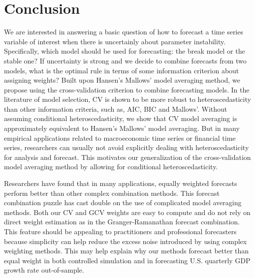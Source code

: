 \section{Conclusion}
We are interested in answering a basic question of how to forecast a time series variable of interest when there is uncertainly about parameter instability. Specifically, which model should be used for forecasting: the break model or the stable one? If uncertainty is strong and we decide to combine forecasts from two models, what is the optimal rule in terms of some information criterion about assigning weights? Built upon Hansen's Mallows' model averaging method, we propose using the cross-validation criterion to combine forecasting models. In the literature of model selection, CV is shown to be more robust to heteroscedasticity than other information criteria, such as, AIC, BIC and Mallows'. Without assuming conditional heteroscedasticity, we show that CV model averaging is approximately equivalent to Hansen's Mallows' model averaging. But in many empirical applications related to macroeconomic time series or financial time series, researchers can usually not avoid explicitly dealing with heteroscedasticity for analysis and forecast. This motivates our generalization of the cross-validation model averaging method by allowing for conditional heteroscedasticity.

Researchers have found that in many applications, equally weighted forecasts perform better than other complex combination methods. This forecast combination puzzle has cast double on the use of complicated model averaging methods. Both our CV and GCV weights are easy to compute and do not rely on direct weight estimation as in the Granger-Ramanathan forecast combination. This feature should be appealing to practitioners and professional forecasters because simplicity can help reduce the excess noise introduced by using complex weighting methods. This may help explain why our methods forecast better than equal weight in both controlled simulation and in forecasting U.S. quarterly GDP growth rate out-of-sample.

